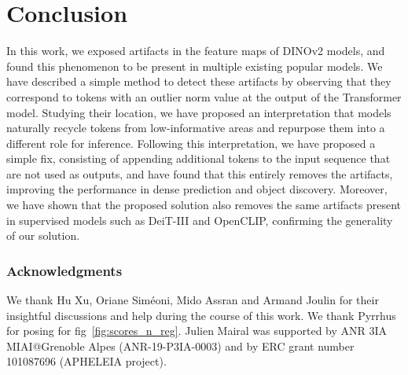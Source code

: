 \documentclass{article} \usepackage{iclr2024_conference,times}
\newcommand{\new}[1]{{#1}}
\newcommand{\old}[1]{}
\begin{document}
\section{Conclusion}
In this work, we exposed artifacts in the feature maps of DINOv2 models, and found this phenomenon to 
be present in multiple existing popular models. We \new{have} described a simple method to detect these artifacts 
by observing that they correspond to tokens with an outlier norm value at the output of the Transformer 
model. Studying their location, we \new{have} proposed an interpretation that models naturally recycle tokens 
from low-informative areas and repurpose them into a different role for inference. Following this 
interpretation, we \new{have} proposed a simple fix, consisting of appending additional tokens to the input sequence 
that are not used as outputs, and \new{have} found that this entirely removes the artifacts, improving the 
performance in dense prediction and object discovery. Moreover, we \new{have shown}\old{showed} that the proposed solution also 
removes the same artifacts present in supervised models such as DeiT-III and OpenCLIP, confirming the generality of our solution. 

\subsubsection*{Acknowledgments}
We thank Hu Xu, Oriane Siméoni, Mido Assran and Armand Joulin for their insightful discussions and help during the course of this work.
We thank Pyrrhus for posing for fig~\ref{fig:scores_n_reg}.
Julien Mairal was supported by ANR 3IA MIAI@Grenoble Alpes (ANR-19-P3IA-0003) and by ERC grant number 101087696 (APHELEIA project).
\end{document}
